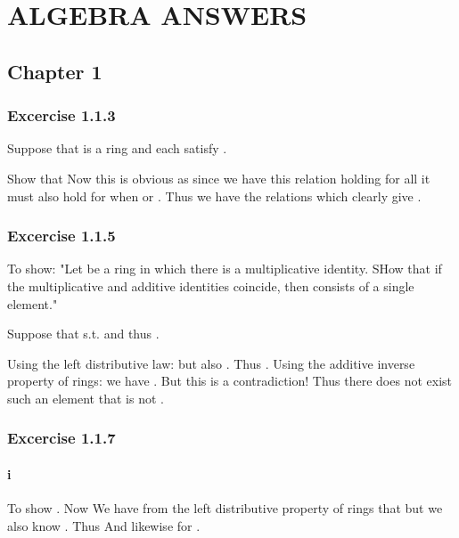 \section{ALGEBRA ANSWERS}
\subsection{Chapter 1}
\subsubsection{Excercise 1.1.3}
Suppose that  is a ring and  each satisfy .

Show that 
Now this is obvious as since we have this relation holding for all  it must also hold for when  or . 
Thus we have the relations  which clearly give .

\subsubsection{Excercise 1.1.5}
To show: "Let  be a ring in which there is a multiplicative identity. SHow that if the multiplicative and additive identities coincide, then  consists of a single element."

Suppose that  s.t.  and thus .

Using the left distributive law:  but also . Thus . Using the additive inverse property of rings: we have . But this is a contradiction! Thus there does not exist such an element  that is not .

\subsubsection{Excercise 1.1.7}
\paragraph{i}
To show .
Now We have from the left distributive property of rings that  but we also know . Thus 
And likewise for .

